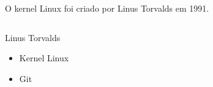 \documentclass{beamer}
\begin{document}
\begin{frame}
  O kernel Linux foi criado por Linus Torvalds em 1991.

  \begin{columns}

    \begin{block}{Linus Torvalds}

      \begin{figure}
      \end{figure}

      \begin{itemize}
      \item Kernel Linux
      \item Git
      \end{itemize}

    \end{block}

  \end{columns}

\end{frame}
\end{document}

